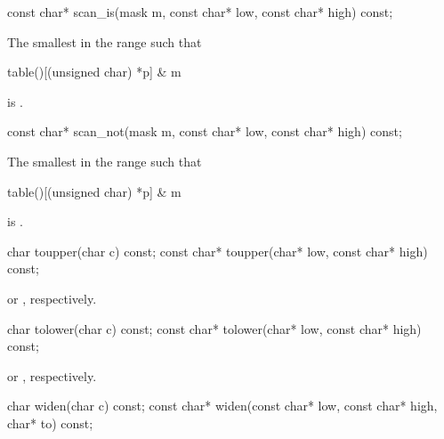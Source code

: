 %
\begin{itemdecl}
const char* scan_is(mask m, const char* low, const char* high) const;
\end{itemdecl}

\begin{itemdescr}
\pnum
\returns
The smallest
in the range
such that
\begin{codeblock}
table()[(unsigned char) *p] & m
\end{codeblock}
is
.
\end{itemdescr}

%
\begin{itemdecl}
const char* scan_not(mask m, const char* low, const char* high) const;
\end{itemdecl}

\begin{itemdescr}
\pnum
\returns
The smallest
in the range
such that
\begin{codeblock}
table()[(unsigned char) *p] & m
\end{codeblock}
is
.
\end{itemdescr}

%
\begin{itemdecl}
char        toupper(char c) const;
const char* toupper(char* low, const char* high) const;
\end{itemdecl}

\begin{itemdescr}
\pnum
\returns
{}
or
,
respectively.
\end{itemdescr}

%
\begin{itemdecl}
char        tolower(char c) const;
const char* tolower(char* low, const char* high) const;
\end{itemdecl}

\begin{itemdescr}
\pnum
\returns
{}
or
,
respectively.
\end{itemdescr}

%
\begin{itemdecl}
char  widen(char c) const;
const char* widen(const char* low, const char* high, char* to) const;
\end{itemdecl}

